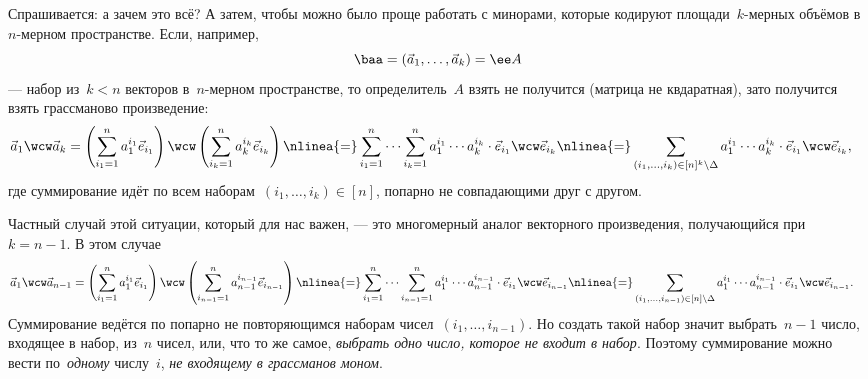 Спрашивается: а зачем это всё? А затем, чтобы можно было проще работать с минорами, которые кодируют площади~$k$-мерных объёмов в~$n$-мерном пространстве. Если, например, 
\[
	\baa = (\vec{a}_1, \dots, \vec{a}_k) = \ee A
\]
--- набор из~$k < n$ векторов в~$n$-мерном пространстве, то определитель~$A$ взять не получится (матрица не квдаратная), зато получится взять грассманово произведение:
\begin{align*}
	\vec{a}_1 \wcw \vec{a}_k
	&=
	\left( 
		\sum_{i_1 = 1}^{n}
			a_1^{i_1}
			\vec{e}_{i_1}
	\right)
	\wcw
	\left( 
		\sum_{i_k = 1}^{n}
			a_k^{i_k}
			\vec{e}_{i_k}
	\right)
	\nlinea{=}
	\sum_{i_1 = 1}^{n}
	\cdots
	\sum_{i_k = 1}^{n}
		a_1^{i_1}
		\cdots
		a_k^{i_k}
	\cdot
		\vec{e}_{i_1}
		\wcw
		\vec{e}_{i_k}
	\nlinea{=}
	\sum_{(i_1, \dots, i_k) \in [n]^k \setminus \Delta}
		a_1^{i_1}
		\cdots
		a_k^{i_k}
	\cdot
		\vec{e}_{i_1}
		\wcw
		\vec{e}_{i_k}
	,
\end{align*}
где суммирование идёт по всем наборам~$(i_1, \dots, i_k) \in [n]$, попарно не совпадающими друг с другом.

Частный случай этой ситуации, который для нас важен, --- это многомерный аналог векторного произведения, получающийся при~$k = n-1$. В этом случае
\begin{align*}
	\vec{a}_1 \wcw \vec{a}_{n-1}
	&=
	\left( 
		\sum_{i_1 = 1}^{n}
			a_1^{i_1}
			\vec{e}_{i_1}
	\right)
	\wcw
	\left( 
		\sum_{i_{n-1} = 1}^{n}
			a_{n-1}^{i_{n-1}}
			\vec{e}_{i_{n-1}}
	\right)
	\nlinea{=}
	\sum_{i_1 = 1}^{n}
	\cdots
	\sum_{i_{n-1} = 1}^{n}
		a_1^{i_1}
		\cdots
		a_{n-1}^{i_{n-1}}
	\cdot
		\vec{e}_{i_1}
		\wcw
		\vec{e}_{i_{n-1}}
	\nlinea{=}
	\sum_{(i_1, \dots, i_{n-1}) \in [n] \setminus \Delta}
		a_1^{i_1}
		\cdots
		a_{n-1}^{i_{n-1}}
	\cdot
		\vec{e}_{i_1}
		\wcw
		\vec{e}_{i_{n-1}}
	.
\end{align*}
Суммирование ведётся по попарно не повторяющимся наборам чисел~$(i_1, \dots, i_{n-1})$. Но создать такой набор значит выбрать~$n-1$ число, входящее в набор, из~$n$ чисел, или, что то же самое, \emph{выбрать одно число, которое не входит в набор}. Поэтому суммирование можно вести по~\emph{одному} числу~$i$, \emph{не входящему в грассманов моном}.

